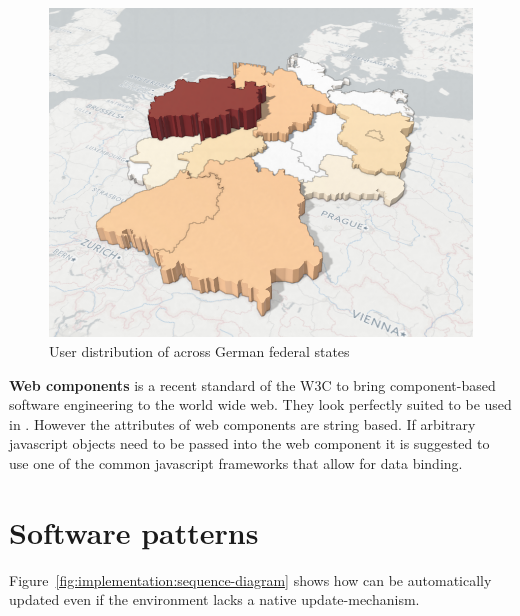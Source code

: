 \begin{figure}[h!]
  \centering
  \includegraphics[width=\textwidth]{images/ua_example.png}
  \caption{%
    User distribution of \rufu{} across German federal states
  }\label{fig:implementation:user_distribution}
\end{figure}

\textbf{Web components} is a recent standard of the W3C\cite{W3C2017} to bring component-based software engineering to the world wide web.
They look perfectly suited to be used in \cmvs{}.
However the attributes of web components are string based.
If arbitrary javascript objects need to be passed into the web component it is suggested to use one of the common javascript frameworks that allow for data binding.

\section{Software patterns}
Figure~\ref{fig:implementation:sequence-diagram} shows how \cmvs{} can be automatically updated even if the environment lacks a native update-mechanism.

